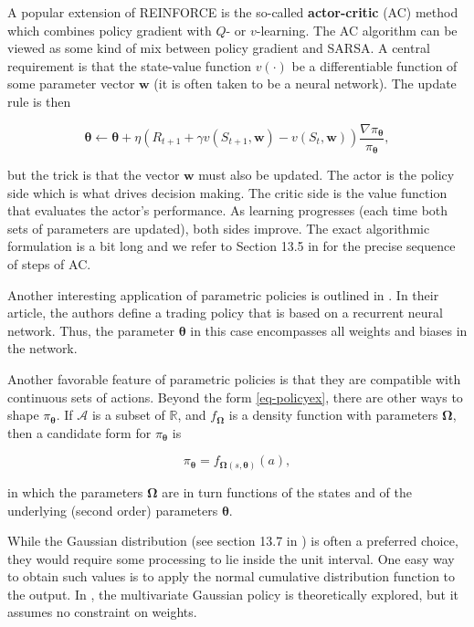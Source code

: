 A popular extension of REINFORCE is the so-called \textbf{actor-critic} (AC) method which combines policy gradient with $Q$- or $v$-learning. The AC algorithm can be viewed as some kind of mix between policy gradient and SARSA. A central requirement is that the state-value function $v(\cdot)$ be a differentiable function of some parameter vector $\textbf{w}$ (it is often taken to be a neural network). The update rule is then

\begin{equation}
\label{eq-ascentAC}
\boldsymbol{\theta} \leftarrow \boldsymbol{\theta} + \eta \left(R_{t+1}+\gamma v(S_{t+1},\textbf{w})-v(S_t,\textbf{w}) \right)\frac{\nabla \pi_{\boldsymbol{\theta}}}{\pi_{\boldsymbol{\theta}}},
\end{equation}

but the trick is that the vector $\textbf{w}$ must also be updated. The actor is the policy side which is what drives decision making. The critic side is the value function that evaluates the actor's performance. As learning progresses (each time both sets of parameters are updated), both sides improve. The exact algorithmic formulation is a bit long and we refer to Section 13.5 in \cite{sutton2018reinforcement} for the precise sequence of steps of AC.

Another interesting application of parametric policies is outlined in \cite{aboussalah2020continuous}. In their article, the authors define a trading policy that is based on a recurrent neural network. Thus, the parameter $\boldsymbol{\theta}$ in this case encompasses all weights and biases in the network.

Another favorable feature of parametric policies is that they are compatible with continuous sets of actions. Beyond the form \ref{eq-policyex}, there are other ways to shape $\pi_{\boldsymbol{\theta}}$. If $\mathcal{A}$ is a subset of $\mathbb{R}$, and $f_{\boldsymbol{\Omega}}$ is a density function with parameters $\boldsymbol{\Omega}$, then a candidate form for $\pi_{\boldsymbol{\theta}}$ is

\begin{equation}
\label{eq-parpol}
\pi_{\boldsymbol{\theta}} = f_{\boldsymbol{\Omega}(s,\boldsymbol{\theta})}(a),
\end{equation}

in which the parameters $\boldsymbol{\Omega}$ are in turn functions of the states and of the underlying (second order) parameters $\boldsymbol{\theta}$.

While the Gaussian distribution (see section 13.7 in \cite{sutton2018reinforcement}) is often a preferred choice, they would require some processing to lie inside the unit interval. One easy way to obtain such values is to apply the normal cumulative distribution function to the output. In \cite{wang2019continuous}, the multivariate Gaussian policy is theoretically explored, but it assumes no constraint on weights.

